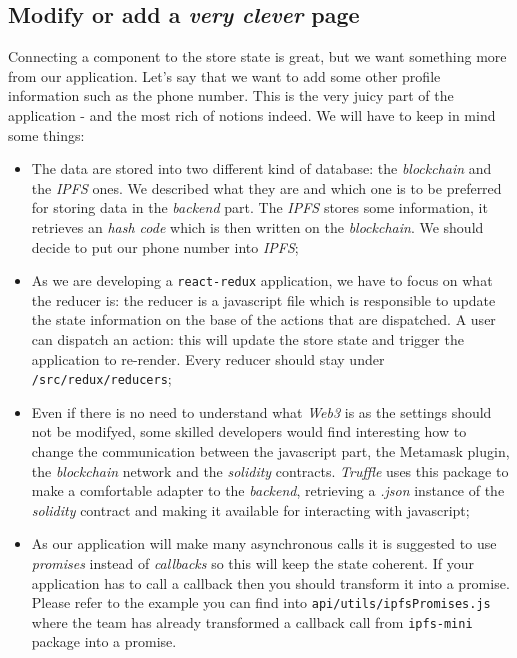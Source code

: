 \subsection{Modify or add a \emph{very clever} page}
\label{IPFS}
Connecting a component to the store state is great, but we want something more from our application. Let's say that we want to add some other profile information such as the phone number. This is the very juicy part of the application - and the most rich of notions indeed. We will have to keep in mind some things:
\begin{itemize}
	\item The data are stored into two different kind of database: the \emph{blockchain} and the \emph{IPFS} ones. We described what they are and which one is to be preferred for storing data in the \emph{backend} part. The \emph{IPFS} stores some information, it retrieves an \emph{hash code} which is then written on the \emph{blockchain}. We should decide to put our phone number into \emph{IPFS};
	\item As we are developing a \verb|react-redux| application, we have to focus on what the reducer is: the reducer is a javascript file which is responsible to update the state information on the base of the actions that are dispatched. A user can dispatch an action: this will update the store state and trigger the application to re-render. Every reducer should stay under \verb|/src/redux/reducers|;
	\item Even if there is no need to understand what \emph{Web3} is as the settings should not be modifyed, some skilled developers would find interesting how to change the communication between the javascript part, the Metamask plugin, the \emph{blockchain} network and the \emph{solidity} contracts. \emph{Truffle} uses this package to make a comfortable adapter to the \emph{backend}, retrieving a \emph{.json} instance of the \emph{solidity} contract and making it available for interacting with javascript;
	\item As our application will make many asynchronous calls it is suggested to use \emph{promises} instead of \emph{callbacks} so this will keep the state coherent. If your application has to call a callback then you should transform it into a promise. Please refer to the example you can find into \verb|api/utils/ipfsPromises.js| where the team has already transformed a callback call from \verb|ipfs-mini| package into a promise.
\end{itemize}

